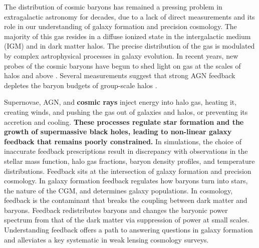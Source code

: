 \documentclass[twocolumn]{aastex631}
\begin{document}
The distribution of cosmic baryons has remained a pressing problem in extragalactic astronomy for decades, due to a lack of 
direct measurements and its role in our understanding of galaxy formation and precision cosmology. The majority 
of this gas resides in a diffuse ionized state in the intergalactic medium (IGM) and in dark matter halos. 
The precise distribution of the gas is modulated 
by complex astrophysical processes in galaxy evolution. In recent years, new probes of the cosmic baryons have begun 
to shed light on gas at the scales of halos and above \citep{bigwood2024, popesso2026, hadzhiyska2024, FRBs}. Several measurements 
suggest that strong AGN feedback depletes the 
baryon budgets of group-scale halos \citep{XX, mccarty2026}.

Supernovae, AGN, and \textbf{cosmic rays} inject energy into 
halo gas, heating it, creating winds, and pushing the gas out of galaxies and halos, or preventing its accretion and cooling. \textbf{These processes regulate star formation and the growth of supermassive black holes, leading to non-linear galaxy feedback that remains poorly constrained.} 
In simulations, the choice of inaccurate feedback
prescriptions result in discrepancy with 
observations in the stellar mass function, halo gas fractions, baryon density profiles, and temperature distributions. Feedback sits at the intersection of galaxy formation and precision cosmology. In galaxy formation feedback regulates how baryons turn into stars, the nature of the CGM, and determines galaxy populations. In cosmology, feedback is the contaminant that breaks the coupling between dark matter and baryons. Feedback redistributes baryons and changes the baryonic power spectrum from that of the dark matter via suppression of power at small scales. Understanding feedback offers a path to answering questions in galaxy formation and alleviates a key systematic in weak lensing cosmology surveys.
\end{document}
